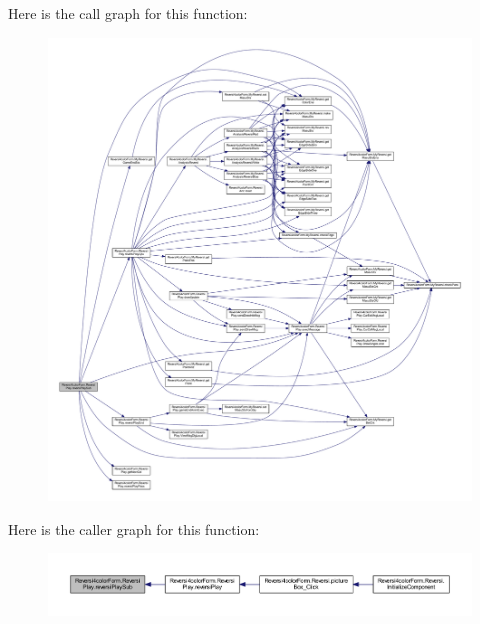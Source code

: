 Here is the call graph for this function\+:\nopagebreak
\begin{figure}[H]
\begin{center}
\leavevmode
\includegraphics[width=350pt]{class_reversi4color_form_1_1_reversi_play_a92b619d3fb9e1fbbb36b6b60f6dee422_cgraph}
\end{center}
\end{figure}
Here is the caller graph for this function\+:\nopagebreak
\begin{figure}[H]
\begin{center}
\leavevmode
\includegraphics[width=350pt]{class_reversi4color_form_1_1_reversi_play_a92b619d3fb9e1fbbb36b6b60f6dee422_icgraph}
\end{center}
\end{figure}
\mbox{\label{class_reversi4color_form_1_1_reversi_play_a99633b55c8a3beff94a2726927fcef09}} 
